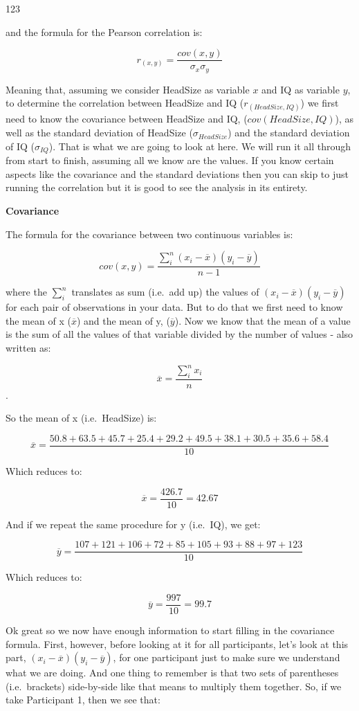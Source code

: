\documentclass[
  oneside]{book}
\begin{document}
123

and the formula for the Pearson correlation is:

\[r_{(x,y)} = \frac{cov(x,y)}{\sigma_{x}\sigma_{y}}\]

Meaning that, assuming we consider HeadSize as variable \(x\) and IQ as variable \(y\), to determine the correlation between HeadSize and IQ (\(r_{(HeadSize, IQ)}\)) we first need to know the covariance between HeadSize and IQ, (\(cov(HeadSize, IQ)\)), as well as the standard deviation of HeadSize (\(\sigma_{HeadSize}\)) and the standard deviation of IQ (\(\sigma_{IQ}\)). That is what we are going to look at here. We will run it all through from start to finish, assuming all we know are the values. If you know certain aspects like the covariance and the standard deviations then you can skip to just running the correlation but it is good to see the analysis in its entirety.

\textbf{Covariance}

The formula for the covariance between two continuous variables is:

\[cov(x,y) = \frac{\sum_i^n(x_i - \overline{x})(y_i - \overline{y})}{n-1}\]

where the \(\sum_i^n\) translates as sum (i.e.~add up) the values of \((x_i - \overline{x})(y_i - \overline{y})\) for each pair of observations in your data. But to do that we first need to know the mean of x (\(\overline{x}\)) and the mean of y, (\(\overline{y}\)). Now we know that the mean of a value is the sum of all the values of that variable divided by the number of values - also written as:

\[\overline{x} = \frac{\sum_i^n x_i}{n}\].

So the mean of x (i.e.~HeadSize) is:

\[\overline{x} = \frac{50.8 + 63.5 +  45.7  + 25.4  + 29.2  + 49.5  + 38.1  + 30.5  + 35.6  + 58.4}{10}\]

Which reduces to:

\[\overline{x} = \frac{426.7}{10} = 42.67\]

And if we repeat the same procedure for y (i.e.~IQ), we get:

\[\overline{y} = \frac{107 + 121 +  106  + 72  + 85  + 105  + 93  + 88  + 97  + 123}{10}\]

Which reduces to:

\[\overline{y} = \frac{997}{10} = 99.7\]

Ok great so we now have enough information to start filling in the covariance formula. First, however, before looking at it for all participants, let's look at this part, \((x_i - \overline{x})(y_i - \overline{y})\), for one participant just to make sure we understand what we are doing. And one thing to remember is that two sets of parentheses (i.e.~brackets) side-by-side like that means to multiply them together. So, if we take Participant 1, then we see that:
\end{document}
